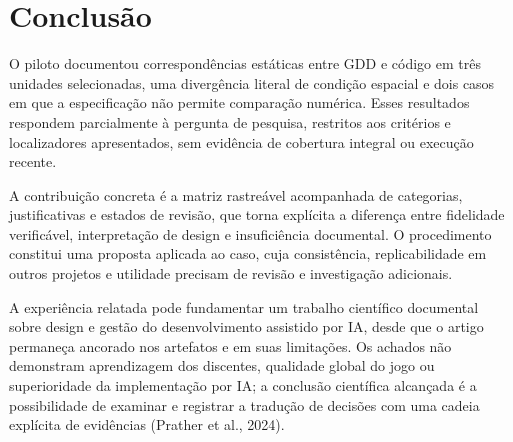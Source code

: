 \section{Conclusão}
O piloto documentou correspondências estáticas entre GDD e código em três unidades selecionadas, uma divergência literal de condição espacial e dois casos em que a especificação não permite comparação numérica. Esses resultados respondem parcialmente à pergunta de pesquisa, restritos aos critérios e localizadores apresentados, sem evidência de cobertura integral ou execução recente.

A contribuição concreta é a matriz rastreável acompanhada de categorias, justificativas e estados de revisão, que torna explícita a diferença entre fidelidade verificável, interpretação de design e insuficiência documental. O procedimento constitui uma proposta aplicada ao caso, cuja consistência, replicabilidade em outros projetos e utilidade precisam de revisão e investigação adicionais.

A experiência relatada pode fundamentar um trabalho científico documental sobre design e gestão do desenvolvimento assistido por IA, desde que o artigo permaneça ancorado nos artefatos e em suas limitações. Os achados não demonstram aprendizagem dos discentes, qualidade global do jogo ou superioridade da implementação por IA; a conclusão científica alcançada é a possibilidade de examinar e registrar a tradução de decisões com uma cadeia explícita de evidências (Prather et al., 2024).

